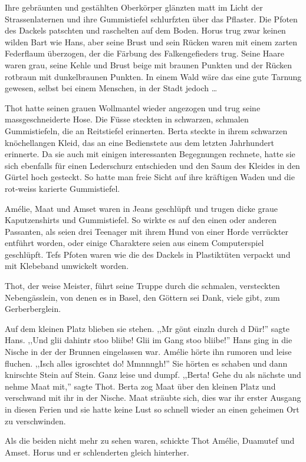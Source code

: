 \documentclass[11pt,titlepage,a5paper]{book}
\begin{document}
Ihre gebräunten und gestählten Oberkörper glänzten matt im Licht der Strassenlaternen und ihre Gummistiefel  schlurfzten über das Pflaster. Die Pfoten des Dackels patschten und raschelten auf dem Boden. Horus trug zwar keinen wilden Bart wie Hans, aber seine Brust und sein Rücken waren mit einem zarten Federflaum überzogen, der die Färbung des Falkengefieders trug. Seine Haare waren grau, seine Kehle und Brust beige mit braunen Punkten und der Rücken rotbraun mit dunkelbraunen Punkten. In einem Wald wäre das eine gute Tarnung gewesen, selbst bei einem Menschen, in der Stadt jedoch \dots

Thot hatte seinen grauen Wollmantel wieder angezogen und trug seine massgeschneiderte Hose. Die Füsse steckten in schwarzen, schmalen Gummistiefeln, die an Reitstiefel erinnerten. Berta steckte in ihrem schwarzen knöchellangen Kleid, das an eine Bedienstete aus dem letzten Jahrhundert erinnerte. Da sie auch mit einigen interessanten Begegnungen rechnete, hatte sie sich ebenfalls für einen Lederschurz entschieden und den Saum des Kleides in den Gürtel hoch gesteckt. So hatte man freie Sicht auf ihre kräftigen Waden und die rot-weiss karierte Gummistiefel.

 Amélie, Maat und Amset waren in Jeans geschlüpft und trugen dicke graue Kaputzenshirts und Gummistiefel. So wirkte es auf den einen oder anderen Passanten, als seien drei Teenager mit ihrem Hund von einer Horde verrückter entführt worden, oder einige Charaktere seien aus einem Computerspiel geschlüpft. Tefs Pfoten waren wie die des Dackels in Plastiktüten verpackt und mit Klebeband umwickelt worden.

Thot, der weise Meister, führt seine Truppe durch die schmalen, versteckten Nebengässlein, von denen es in Basel, den Göttern sei Dank, viele gibt, zum Gerberberglein.

Auf dem kleinen Platz blieben sie stehen. ,,Mr gönt einzln durch d Dür!'' sagte Hans. ,,Und glii dahintr stoo bliibe! Glii im Gang stoo bliibe!'' Hans ging in die Nische in der der Brunnen eingelassen war. Amélie hörte ihn rumoren und leise fluchen. ,,Isch alles igroschtet do! Mmnnngh!'' Sie hörten es schaben und dann knirschte Stein auf Stein. Ganz leise und dumpf. ,,Berta! Gehe du als nächste und nehme Maat mit,'' sagte Thot. Berta zog Maat über den kleinen Platz und verschwand mit ihr in der Nische. Maat sträubte sich, dies war ihr erster Ausgang in diesen Ferien und sie hatte keine Lust so schnell wieder an einen geheimen Ort zu verschwinden.

Als die beiden nicht mehr zu sehen waren, schickte Thot Amélie, Duamutef und Amset. Horus und er schlenderten gleich hinterher. 
\end{document}
